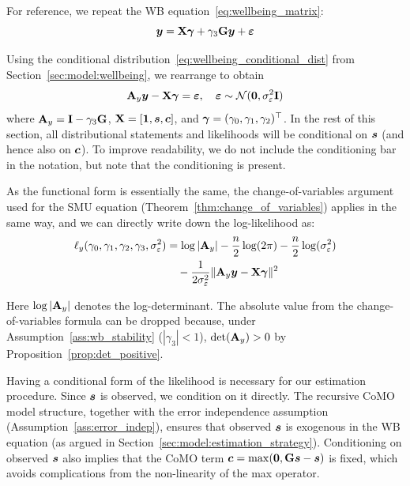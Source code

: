 For reference, we repeat the WB equation~\eqref{eq:wellbeing_matrix}:
\[
    \bm{y} = \mathbf{X}\bm{\gamma} + \gamma_3\mathbf{G}\bm{y} + \bm{\varepsilon}
\]

Using the conditional distribution~\eqref{eq:wellbeing_conditional_dist} from Section~\ref{sec:model:wellbeing}, we rearrange to obtain
\begin{equation}
    \mathbf{A}_y\bm{y} - \mathbf{X}\bm{\gamma} = \bm{\varepsilon}, \quad \bm{\varepsilon} \sim \mathcal{N}(\bm{0}, \sigma_\varepsilon^2\mathbf{I})
\end{equation}
where $\mathbf{A}_y = \mathbf{I} - \gamma_3\mathbf{G}$, $\mathbf{X} = [\bm{1}, \bm{s}, \bm{c}]$, and $\bm{\gamma} = (\gamma_0, \gamma_1, \gamma_2)^\top$. In the rest of this section, all distributional statements and likelihoods will be conditional on $\bm{s}$ (and hence also on $\bm{c}$). To improve readability, we do not include the conditioning bar in the notation, but note that the conditioning is present.

As the functional form is essentially the same, the change-of-variables argument used for the SMU equation (Theorem~\ref{thm:change_of_variables}) applies in the same way, and we can directly write down the log-likelihood as:
\begin{align}
\label{eq:loglik_wb}
    \ell_y(\gamma_0, \gamma_1, \gamma_2, \gamma_3, \sigma_\varepsilon^2)
    &= \log|\mathbf{A}_y| - \frac{n}{2}\log(2\pi) - \frac{n}{2}\log(\sigma_\varepsilon^2) \nonumber\\
    &\quad - \frac{1}{2\sigma_\varepsilon^2}\|\mathbf{A}_y\bm{y} - \mathbf{X}\bm{\gamma}\|^2
\end{align}

Here $\log|\mathbf{A}_y|$ denotes the log-determinant. The absolute value from the change-of-variables formula can be dropped because, under Assumption~\ref{ass:wb_stability} ($|\gamma_3| < 1$), $\det(\mathbf{A}_y) > 0$ by Proposition~\ref{prop:det_positive}.

Having a conditional form of the likelihood is necessary for our estimation procedure. Since $\bm{s}$ is observed, we condition on it directly. The recursive CoMO model structure, together with the error independence assumption (Assumption~\ref{ass:error_indep}), ensures that observed $\bm{s}$ is exogenous in the WB equation (as argued in Section~\ref{sec:model:estimation_strategy}). Conditioning on observed $\bm{s}$ also implies that the CoMO term $\bm{c} = \max(\bm{0}, \mathbf{G}\bm{s} - \bm{s})$ is fixed, which avoids complications from the non-linearity of the max operator.

